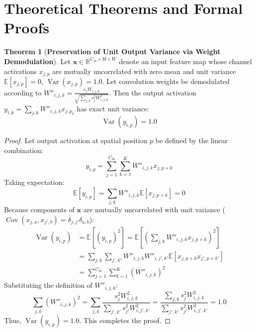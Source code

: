\documentclass[11pt,a4paper]{article}
\theoremstyle{definition}
\newtheorem{theorem}{\textbf{Theorem}}[section]
\begin{document}
\section{Theoretical Theorems and Formal Proofs}

\begin{theorem}[\textbf{Preservation of Unit Output Variance via Weight Demodulation}]
Let $\mathbf{x} \in \mathbb{R}^{C_{\text{in}} \times H \times W}$ denote an input feature map whose channel activations $x_{j, p}$ are mutually uncorrelated with zero mean and unit variance $\mathbb{E}[x_{j, p}] = 0$, $\operatorname{Var}(x_{j, p}) = 1.0$. Let convolution weights be demodulated according to $W''_{i, j, k} = \frac{s_j W_{i, j, k}}{\sqrt{\sum_{j, k} s_j^2 W_{i, j, k}^2}}$. Then the output activation $y_{i, p} = \sum_{j, k} W''_{i, j, k} x_{j, p_k}$ has exact unit variance:
{\boldmath
\begin{equation}
\operatorname{Var}(y_{i, p}) = 1.0
\end{equation}
}
\end{theorem}

\begin{proof}
Let output activation at spatial position $p$ be defined by the linear combination:
{\boldmath
\begin{equation}
y_{i, p} = \sum_{j=1}^{C_{\text{in}}} \sum_{k=1}^K W''_{i, j, k} x_{j, p+k}
\end{equation}
}
Taking expectation:
{\boldmath
\begin{equation}
\mathbb{E}[y_{i, p}] = \sum_{j, k} W''_{i, j, k} \mathbb{E}[x_{j, p+k}] = 0
\end{equation}
}
Because components of $\mathbf{x}$ are mutually uncorrelated with unit variance ($\operatorname{Cov}(x_{j, a}, x_{j', b}) = \delta_{j, j'} \delta_{a, b}$):
{\boldmath
\begin{align}
\operatorname{Var}(y_{i, p}) &= \mathbb{E}[(y_{i, p})^2] = \mathbb{E}\left[ \left( \sum_{j, k} W''_{i, j, k} x_{j, p+k} \right)^2 \right] \\
&= \sum_{j, k} \sum_{j', k'} W''_{i, j, k} W''_{i, j', k'} \mathbb{E}[x_{j, p+k} x_{j', p+k'}] \\
&= \sum_{j=1}^{C_{\text{in}}} \sum_{k=1}^K (W''_{i, j, k})^2
\end{align}
}
Substituting the definition of $W''_{i, j, k}$:
{\boldmath
\begin{equation}
\sum_{j, k} (W''_{i, j, k})^2 = \sum_{j, k} \frac{s_j^2 W_{i, j, k}^2}{\sum_{j', k'} s_{j'}^2 W_{i, j', k'}^2} = \frac{\sum_{j, k} s_j^2 W_{i, j, k}^2}{\sum_{j', k'} s_{j'}^2 W_{i, j', k'}^2} = 1.0
\end{equation}
}
Thus, $\operatorname{Var}(y_{i, p}) = 1.0$. This completes the proof.
\end{proof}
\end{document}
